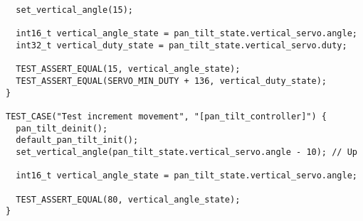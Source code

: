 \begin{lstlisting}
  set_vertical_angle(15);

  int16_t vertical_angle_state = pan_tilt_state.vertical_servo.angle;
  int32_t vertical_duty_state = pan_tilt_state.vertical_servo.duty;

  TEST_ASSERT_EQUAL(15, vertical_angle_state);
  TEST_ASSERT_EQUAL(SERVO_MIN_DUTY + 136, vertical_duty_state);
}

TEST_CASE("Test increment movement", "[pan_tilt_controller]") {
  pan_tilt_deinit();
  default_pan_tilt_init();
  set_vertical_angle(pan_tilt_state.vertical_servo.angle - 10); // Up

  int16_t vertical_angle_state = pan_tilt_state.vertical_servo.angle;

  TEST_ASSERT_EQUAL(80, vertical_angle_state);
}    
\end{lstlisting}